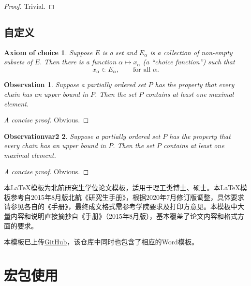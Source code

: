 \begin{proof}
  Trivial.
\end{proof}



\subsection{自定义}

\newtheorem*{axiomofchoice}{Axiom of choice}
\begin{axiomofchoice}
  Suppose $E$ is a set and ${E_\alpha}$ is a collection of
  non-empty subsets of $E$. Then there is a function $\alpha
  \mapsto x_\alpha$ (a ``choice function'') such that
  \begin{equation}
  x_\alpha \in E_\alpha,\qquad \text{for all }\alpha.
  \end{equation}
\end{axiomofchoice}

\newtheorem{observation}{Observation}[chapter]
\begin{observation}
  Suppose a partially ordered set $P$ has the property
  that every chain has an upper bound in $P$. Then the
  set $P$ contains at least one maximal element.
\end{observation}
\begin{proof}[A concise proof]
  Obvious.
\end{proof}

\newtheorem{observationvar2}[observation]{Observationvar2}
\begin{observationvar2}
  Suppose a partially ordered set $P$ has the property
  that every chain has an upper bound in $P$. Then the
  set $P$ contains at least one maximal element.
\end{observationvar2}
\begin{proof}[A concise proof]
  Obvious.
\end{proof}

本\LaTeX{}模板为北航研究生学位论文模板，适用于理工类博士、硕士。本\LaTeX{}模板参考自2015年8月版北航《研究生手册》，根据2020年7月修订版调整，具体要求请参见各自的《手册》，最终成文格式需参考学院要求及打印方意见。本模板中大量内容和说明直接摘抄自《手册》（2015年8月版），基本覆盖了论文内容和格式方面的要求。

本模板已上传\href{https://github.com/CheckBoxStudio/BUAAThesis}{GitHub}，该仓库中同时也包含了相应的Word模板。

\section{宏包使用}

